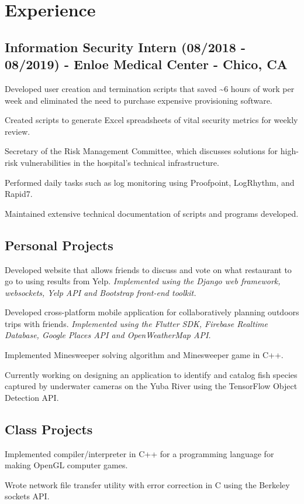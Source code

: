 \documentclass[letterpaper]{article}
\renewenvironment{itemize}{
  \begin{list}{}{
    \setlength{\leftmargin}{1.5em}
  }
}{
  \end{list}
}
\begin{document}
\section*{Experience}
\subsection*{Information Security Intern (08/2018 - 08/2019) - Enloe Medical Center - Chico, CA
}
\begin{itemize}
    \item[$\bullet$] Developed user creation and termination scripts that saved \textasciitilde 6 hours of work per week and eliminated the need to purchase expensive provisioning software.
 \item[$\bullet$] Created scripts to generate Excel spreadsheets of vital security metrics for weekly review.
 \item[$\bullet$] Secretary of the Risk Management Committee, which discusses solutions for high-risk vulnerabilities in the hospital's technical infrastructure.
 \item[$\bullet$] Performed daily tasks such as log monitoring using Proofpoint, LogRhythm, and Rapid7.
 \item[$\bullet$] Maintained extensive technical documentation of scripts and programs developed.
\end{itemize}
\subsection*{Personal Projects}
\begin{itemize}
    \item[$\bullet$] Developed website that allows friends to discuss and vote on what restaurant to go to using results from Yelp. \emph{Implemented using the Django web framework, websockets, Yelp API and Bootstrap front-end toolkit.}
    \item[$\bullet$] Developed cross-platform mobile application for collaboratively planning outdoors trips with friends. \emph{Implemented using the Flutter SDK, Firebase Realtime Database, Google Places API and OpenWeatherMap API.}
    \item[$\bullet$] Implemented Minesweeper solving algorithm and Minesweeper game in C++.
    \item[$\bullet$] Currently working on designing an application to identify and catalog fish species captured by underwater cameras on the Yuba River using the TensorFlow Object Detection API.
\end{itemize}
\subsection*{Class Projects}
\begin{itemize}
    \item[$\bullet$] Implemented compiler/interpreter in C++ for a programming language for making OpenGL computer games.
    \item[$\bullet$] Wrote network file transfer utility with error correction in C using the Berkeley sockets API.
\end{itemize}
\end{document}
